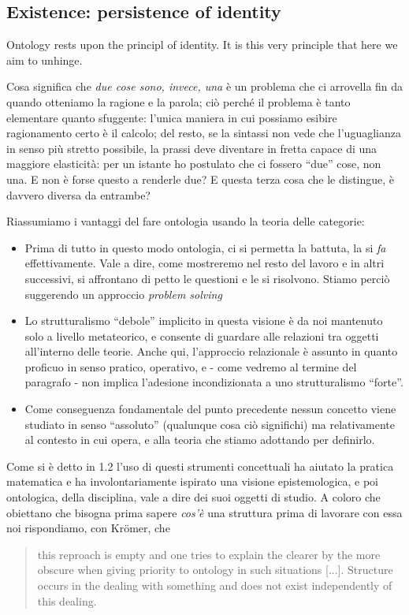 \subsection{Existence: persistence of identity}
Ontology rests upon the principl of identity. It is this very principle that here we aim to unhinge.

Cosa significa che \emph{due cose sono, invece, una} è un problema che ci arrovella fin da quando otteniamo la ragione e la parola; ciò perché il problema è tanto elementare quanto sfuggente: l'unica maniera in cui possiamo esibire ragionamento certo è il calcolo; del resto, se la sintassi non vede che l'uguaglianza in senso più stretto possibile, la prassi deve diventare in fretta capace di una maggiore elasticità: per un istante ho postulato che ci fossero ``due'' cose, non una. E non è forse questo a renderle due? E questa terza cosa che le distingue, è davvero diversa da entrambe?

Riassumiamo i vantaggi del fare ontologia usando la teoria delle categorie:
	\begin{itemize}
		\item Prima di tutto in questo modo ontologia, ci si permetta la battuta, la si \emph{fa} effettivamente. Vale a dire, come mostreremo nel resto del lavoro e in altri successivi, si affrontano di petto le questioni e le si risolvono. Stiamo perciò suggerendo un approccio \emph{problem solving}
		\item Lo strutturalismo ``debole'' implicito in questa visione è da noi mantenuto solo a livello metateorico, e consente di guardare alle relazioni tra oggetti all'interno delle teorie. Anche qui, l'approccio relazionale è assunto in quanto proficuo in senso pratico, operativo, e - come vedremo al termine del paragrafo - non implica l'adesione incondizionata a uno strutturalismo ``forte''.
		\item Come conseguenza fondamentale del punto precedente nessun concetto viene studiato in senso ``assoluto'' (qualunque cosa ciò significhi) ma relativamente al contesto in cui opera, e alla teoria che stiamo adottando per definirlo.
	\end{itemize}

	Come si è detto in 1.2 l'uso di questi strumenti concettuali ha aiutato la pratica matematica e ha involontariamente ispirato una visione epistemologica, e poi ontologica, della disciplina, vale a dire dei suoi oggetti di studio. A coloro che obiettano che bisogna prima sapere \textit{cos'è} una struttura prima di lavorare con essa noi rispondiamo, con Kr\"omer, che
\begin{quote}
	this reproach is empty and one tries to explain the clearer by the more obscure when giving priority to ontology in such situations [...]. Structure occurs in the dealing with something and does
	not exist independently of this dealing. \cite{kromer2007tool}
\end{quote}




